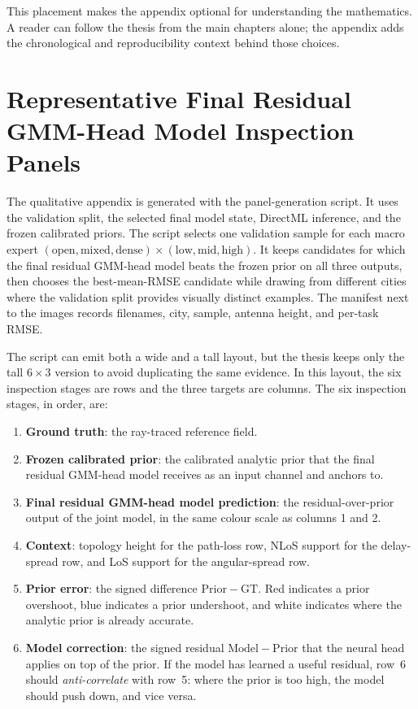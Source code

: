This placement makes the appendix optional for understanding the mathematics.
A reader can follow the thesis from the main chapters alone; the appendix adds
the chronological and reproducibility context behind those choices.

\chapter{Representative Final Residual GMM-Head Model Inspection Panels}

The qualitative appendix is generated with the panel-generation script. It uses
the validation split, the selected final model state, DirectML
inference, and the frozen calibrated priors. The script selects one validation
sample for each macro expert
\((\mathrm{open},\mathrm{mixed},\mathrm{dense})\times
(\mathrm{low},\mathrm{mid},\mathrm{high})\). It keeps candidates for which
the final residual GMM-head model beats the frozen prior on all three outputs, then chooses the
best-mean-RMSE candidate while drawing from different cities where the
validation split provides visually distinct examples. The manifest next to
the images records filenames, city, sample, antenna height, and per-task RMSE.

The script can emit both a wide and a tall layout, but the thesis keeps only
the tall \(6\times 3\) version to avoid duplicating the same evidence. In this
layout, the six inspection stages are rows and the three targets are columns.
The six inspection stages, in order, are:

\begin{enumerate}
\setlength\itemsep{0.15em}
  \item \textbf{Ground truth}: the ray-traced reference field.
  \item \textbf{Frozen calibrated prior}: the calibrated analytic prior
        that the final residual GMM-head model receives as an input channel and anchors to.
  \item \textbf{Final residual GMM-head model prediction}: the residual-over-prior output
        of the joint model, in the same colour scale as columns 1 and 2.
  \item \textbf{Context}: topology height for the path-loss row, NLoS
        support for the delay-spread row, and LoS support for the
        angular-spread row.
  \item \textbf{Prior error}: the signed difference
        \(\mathrm{Prior}-\mathrm{GT}\). Red indicates a prior overshoot,
        blue indicates a prior undershoot, and white indicates where the
        analytic prior is already accurate.
  \item \textbf{Model correction}: the signed residual
        \(\mathrm{Model}-\mathrm{Prior}\) that the neural head applies on
        top of the prior. If the model has learned a useful residual,
        row~6 should \emph{anti-correlate} with row~5: where the prior
        is too high, the model should push down, and vice versa.
\end{enumerate}

